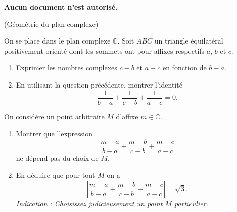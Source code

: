 \documentclass[a4paper,12pt,reqno]{amsart}
\begin{document}
\ifsolutions\else
\textbf{Aucun document n'est autorisé.}

\vspace{7mm}
\fi

\begin{exo} (Géométrie du plan complexe)

  On se place dans le plan complexe $\mathbb{C}$. Soit $ABC$ un triangle équilatéral positivement orienté dont les sommets ont pour affixes respectifs $a$, $b$ et $c$.
  \begin{enumerate}
    \item Exprimer les nombres complexes $c-b$ et $a-c$ en fonction de $b-a$.
    \item En utilisant la question précédente, montrer l'identité
    \[
      \frac{1}{b-a}+\frac{1}{c-b}+\frac{1}{a-c}=0.
    \]
  \end{enumerate}

  On considère un point arbitraire $M$ d'affixe $m \in \mathbb{C}$.
  \begin{enumerate}[resume]
    \item Montrer que l'expression
    \[
      \frac{m-a}{b-a}+\frac{m-b}{c-b}+\frac{m-c}{a-c}
    \]
    ne dépend pas du choix de $M$.
    \item En déduire que pour tout $M$ on a
    \[
      \left| \frac{m-a}{b-a}+\frac{m-b}{c-b}+\frac{m-c}{a-c} \right| = \sqrt{3}.
    \]
    \emph{Indication : Choisissez judicieusement un point $M$ particulier.}
  \end{enumerate}


\end{exo}
\end{document}
